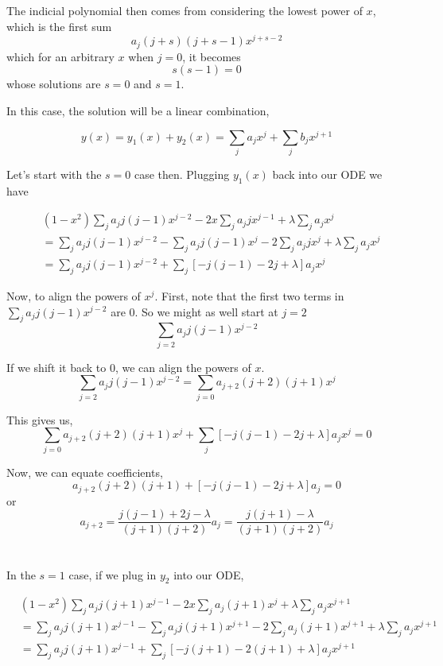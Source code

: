 The indicial polynomial then comes from considering the lowest power of $x$, which is the first sum
$$
a_j (j+s)(j+s-1) x^{j+s-2}
$$
which for an arbitrary $x$ when $j=0$, it becomes
$$
s(s-1) = 0
$$
whose solutions are $s=0$ and $s=1$.

In this case, the solution will be a linear combination,

$$
y(x) = y_1 (x) + y_2 (x)
= \sum_j a_j x^{j} + \sum_j b_j x^{j+1}
$$

Let's start with the $s=0$ case then.
Plugging $y_1 (x)$ back into our ODE we have

\begin{align*}
& (1-x^2) \sum_j a_j j(j-1) x^{j-2}
    - 2x \sum_j a_j j x^{j-1}
    + \lambda \sum_j a_j x^j \\
&= \sum_j a_j j(j-1) x^{j-2}
    - \sum_j a_j j(j-1) x^{j}
    - 2 \sum_j a_j j x^{j}
    + \lambda \sum_j a_j x^j \\
&= \sum_j a_j j(j-1) x^{j-2}
    + \sum_j \left[ -j(j-1) -2j + \lambda \right] a_j x^j
\end{align*}

Now, to align the powers of $x^{j}$.
First, note that the first two terms in
$\sum_j a_j j(j-1) x^{j-2}$ are $0$.
So we might as well start at $j=2$
$$
\sum_{j=2} a_j j(j-1) x^{j-2}
$$

If we shift it back to $0$, we can align the powers of $x$.
$$
\sum_{j=2} a_j j(j-1) x^{j-2} =
\sum_{j=0} a_{j+2} (j+2)(j+1) x^{j}
$$

This gives us,
$$
\sum_{j=0} a_{j+2} (j+2)(j+1) x^{j}
+ \sum_j \left[ -j(j-1) -2j + \lambda \right] a_j x^j
= 0
$$

Now, we can equate coefficients,
$$
a_{j+2} (j+2)(j+1)
    + \left[ -j(j-1) -2j + \lambda \right] a_j = 0
$$
or
$$
a_{j+2} = \frac{ j(j-1) + 2j - \lambda }{ (j+1)(j+2) } a_j
= \frac{ j(j+1) - \lambda  }{ (j+1)(j+2) } a_j
$$
\\~\\

In the $s=1$ case, if we plug in $y_2$ into our ODE,

\begin{align*}
& (1-x^2) \sum_j a_j j(j+1) x^{j-1}
    - 2x \sum_j a_j (j+1) x^{j}
    + \lambda \sum_j a_j x^{j+1} \\
&= \sum_j a_j j(j+1) x^{j-1}
    - \sum_j a_j j(j+1) x^{j+1}
    - 2 \sum_j a_j (j+1) x^{j+1}
    + \lambda \sum_j a_j x^{j+1} \\
&= \sum_j a_j j(j+1) x^{j-1}
    + \sum_j \left[ -j(j+1) -2(j+1) + \lambda \right] a_j x^{j+1}
\end{align*}

